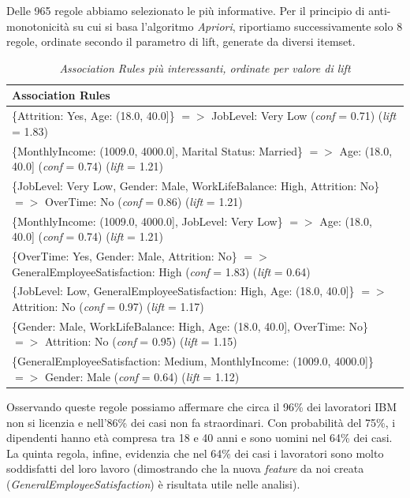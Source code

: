 \noindent Delle 965 regole abbiamo selezionato le più informative. Per il principio di anti-monotonicità su cui si basa l'algoritmo \textit{Apriori}, riportiamo successivamente solo 8 regole, ordinate secondo il parametro di lift, generate da diversi itemset.
\begin{table}[H]
\centering
\small
\begin{tabular}{|p{15cm}|}
\hline
 \textbf{Association Rules} \\
 \hline
\{Attrition: Yes, Age: (18.0, 40.0]\} $=>$ JobLevel: Very Low (\textit{conf} = 0.71) (\textit{lift} = 1.83)\\
\hline
\{MonthlyIncome: (1009.0, 4000.0], Marital Status: Married\} $=>$ Age: (18.0, 40.0] (\textit{conf} = 0.74) (\textit{lift} = 1.21)\\
\hline
\{JobLevel: Very Low, Gender: Male, WorkLifeBalance: High, Attrition: No\} $=>$ OverTime: No (\textit{conf} = 0.86) (\textit{lift} = 1.21)\\
\hline
\{MonthlyIncome: (1009.0, 4000.0], JobLevel: Very Low\} $=>$ Age: (18.0, 40.0] (\textit{conf} = 0.74) (\textit{lift} = 1.21)\\
\hline
 \{OverTime: Yes, Gender: Male, Attrition: No\} $=>$ GeneralEmployeeSatisfaction: High (\textit{conf} = 1.83) (\textit{lift} = 0.64)\\
\hline
\{JobLevel: Low, GeneralEmployeeSatisfaction: High, Age: (18.0, 40.0]\} $=>$ Attrition: No (\textit{conf} = 0.97) (\textit{lift} = 1.17)\\
\hline
\{Gender: Male, WorkLifeBalance: High, Age: (18.0, 40.0], OverTime: No\} $=>$ Attrition: No (\textit{conf} = 0.95) (\textit{lift} = 1.15)\\
\hline
\{GeneralEmployeeSatisfaction: Medium, MonthlyIncome: (1009.0, 4000.0]\} $=>$ Gender: Male (\textit{conf} = 0.64) (\textit{lift} = 1.12)\\
\hline
\end{tabular}
\caption{\textit{Association Rules più interessanti, ordinate per valore di lift}}
\label{ARinteressanti}
\end{table}
\noindent Osservando queste regole possiamo affermare che circa il 96\% dei lavoratori IBM non si licenzia e nell'86\% dei casi non fa straordinari. Con probabilità del 75\%, i dipendenti hanno età compresa tra 18 e 40 anni e sono uomini nel 64\% dei casi. La quinta regola, infine, evidenzia che nel 64\% dei casi i lavoratori sono molto soddisfatti del loro lavoro (dimostrando che la nuova \textit{feature} da noi creata (\textit{GeneralEmployeeSatisfaction}) è risultata utile nelle analisi). 
